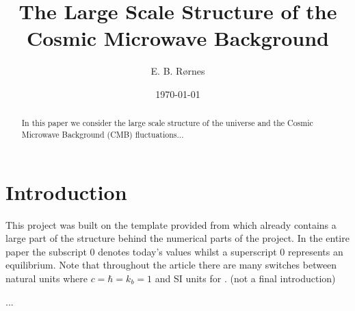 \documentclass[%
reprint,
 amsmath,amssymb,
 aps,
]{revtex4-2}
\begin{document}
\title{The Large Scale Structure of the Cosmic Microwave Background}

\author{E. B. Rørnes}

\date{\today}

\begin{abstract}
In this paper we consider the large scale structure of the universe and the Cosmic Microwave Background (CMB) fluctuations...
\end{abstract}

\maketitle


\section*{Introduction}

This project was built on the template provided from \cite{AST5220LectureNotes} which already contains a large part of the structure behind the numerical parts of the project. In the entire paper the subscript 0 denotes today's values whilst a superscript 0 represents an equilibrium. Note that throughout the article there are many switches between natural units where $c=\hbar=k_b=1$ and SI units for . (not a final introduction)

















\begin{acknowledgements}
	...
\end{acknowledgements}




\end{document}
